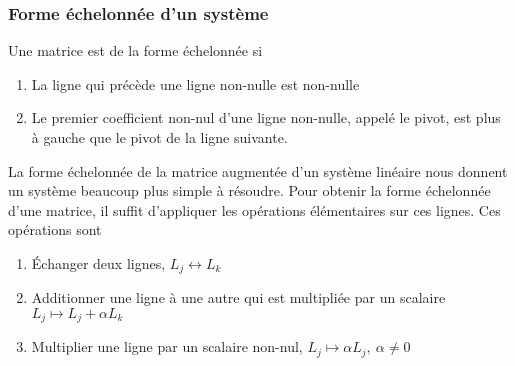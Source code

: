 \subsubsection{Forme échelonnée d'un système}
\begin{definition}
    Une matrice est de la forme échelonnée si \begin{enumerate}
    \item La ligne qui précède une ligne non-nulle est non-nulle
    \item Le premier coefficient non-nul d'une ligne non-nulle, appelé le pivot, est plus à
          gauche que le pivot de la ligne suivante.
    \end{enumerate}
\end{definition}
La forme échelonnée de la matrice augmentée d'un système linéaire nous donnent un système beaucoup plus simple à résoudre. Pour obtenir la forme échelonnée d'une matrice,
il suffit d'appliquer les opérations élémentaires sur ces lignes. Ces opérations sont \begin{enumerate}
    \item Échanger deux lignes, $L_j \leftrightarrow L_k$
    \item Additionner une ligne à une autre qui est multipliée par un scalaire $L_j \mapsto L_j + \alpha L_k$
    \item Multiplier une ligne par un scalaire non-nul, $L_j \mapsto \alpha L_j, \ \alpha \neq 0$
\end{enumerate}

